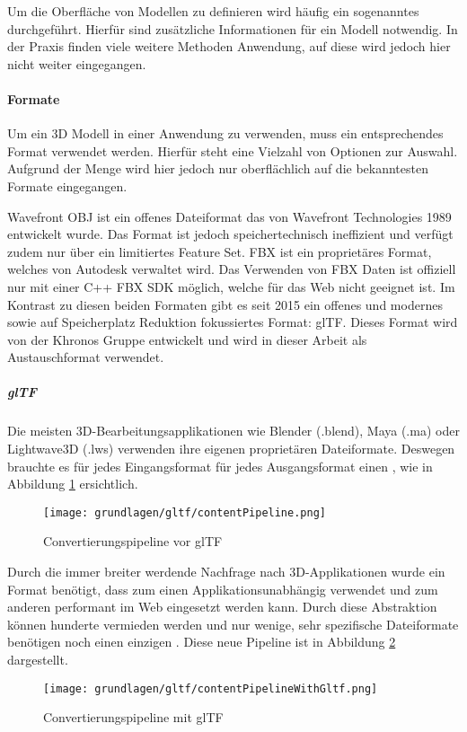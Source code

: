 Um die Oberfläche von Modellen zu definieren wird häufig ein sogenanntes  durchgeführt. Hierfür sind zusätzliche Informationen für ein Modell notwendig. In der Praxis finden viele weitere Methoden Anwendung, auf diese wird jedoch hier nicht weiter eingegangen.

\paragraph{Formate}
Um ein 3D Modell in einer Anwendung zu verwenden, muss ein entsprechendes Format verwendet werden. Hierfür steht eine Vielzahl von Optionen zur Auswahl. Aufgrund der Menge wird hier jedoch nur oberflächlich auf die bekanntesten Formate eingegangen.

Wavefront OBJ ist ein offenes Dateiformat das von Wavefront Technologies 1989 entwickelt wurde. Das Format ist jedoch speichertechnisch ineffizient und verfügt zudem nur über ein limitiertes Feature Set. \cite{objSpec}
FBX ist ein proprietäres Format, welches von Autodesk verwaltet wird. Das Verwenden von FBX Daten ist offiziell nur mit einer C++ FBX SDK möglich, welche für das Web nicht geeignet ist.
Im Kontrast zu diesen beiden Formaten gibt es seit 2015 ein offenes und modernes sowie auf Speicherplatz Reduktion fokussiertes Format: glTF. Dieses Format wird von der Khronos Gruppe entwickelt und wird in dieser Arbeit als Austauschformat verwendet. \cite{gltf1Spec}

\subparagraph{glTF}
Die meisten 3D-Bearbeitungsapplikationen wie Blender (.blend), Maya (.ma) oder Lightwave3D (.lws) verwenden ihre eigenen proprietären Dateiformate. Deswegen brauchte es für jedes Eingangsformat für jedes Ausgangsformat einen , wie in Abbildung \ref{fig:contentPipelineWithoutGltf} ersichtlich.

\begin{figure}[H]
  \centering
  \texttt{[image: grundlagen/gltf/contentPipeline.png]}
  \caption{Convertierungspipeline vor glTF \cite{gltf1Spec}}
  \label{fig:contentPipelineWithoutGltf}
\end{figure}

Durch die immer breiter werdende Nachfrage nach 3D-Applikationen wurde ein Format benötigt, dass zum einen Applikationsunabhängig verwendet und zum anderen performant im Web eingesetzt werden kann. \cite{gltf1Spec}
Durch diese Abstraktion können hunderte  vermieden werden und nur wenige, sehr spezifische Dateiformate benötigen noch einen einzigen . Diese neue Pipeline ist in Abbildung \ref{fig:contentPipelineWithGltf} dargestellt. \cite{gltf1Spec}
\begin{figure}[H]
  \centering
  \texttt{[image: grundlagen/gltf/contentPipelineWithGltf.png]}
  \caption{Convertierungspipeline mit glTF \cite{gltf1Spec}}
  \label{fig:contentPipelineWithGltf}
\end{figure}

